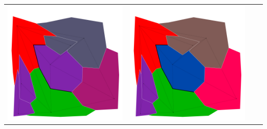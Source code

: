 \documentclass[10pt,a4paper]{article}
\begin{document}
\begin{tabular}{c c c c }
	\includegraphics[scale=.10]{../results/backtracking_mac/map_build/bt_mac_I00005.pdf}&
	\includegraphics[scale=.10]{../results/backtracking_mac/map_build/bt_mac_I00006.pdf}&

\end{tabular}
\end{document}
